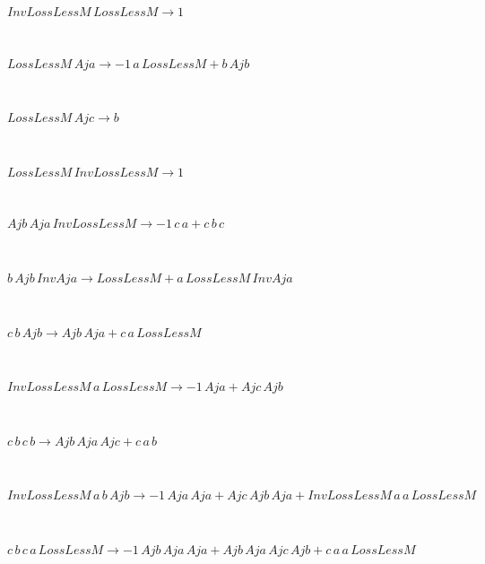 \documentclass[rep10,leqno]{report}
\begin{document}
\begin{minipage}{6in}
$
InvLossLessM\,
 LossLessM\rightarrow 1
$
\end{minipage}\medskip \\
\begin{minipage}{6in}
$
LossLessM\,
 Aja\rightarrow -1\,
 a\,
 LossLessM + b\,
 Ajb
$
\end{minipage}\medskip \\
\begin{minipage}{6in}
$
LossLessM\,
 Ajc\rightarrow b
$
\end{minipage}\medskip \\
\begin{minipage}{6in}
$
LossLessM\,
 InvLossLessM\rightarrow 1
$
\end{minipage}\medskip \\
\begin{minipage}{6in}
$
Ajb\,
 Aja\,
 InvLossLessM\rightarrow -1\,
 c\,
 a + c\,
 b\,
 c
$
\end{minipage}\medskip \\
\begin{minipage}{6in}
$
b\,
 Ajb\,
 InvAja\rightarrow LossLessM + a\,
 LossLessM\,
 InvAja
$
\end{minipage}\medskip \\
\begin{minipage}{6in}
$
c\,
 b\,
 Ajb\rightarrow Ajb\,
 Aja + c\,
 a\,
 LossLessM
$
\end{minipage}\medskip \\
\begin{minipage}{6in}
$
InvLossLessM\,
 a\,
 LossLessM\rightarrow -1\,
 Aja + Ajc\,
 Ajb
$
\end{minipage}\medskip \\
\begin{minipage}{6in}
$
c\,
 b\,
 c\,
 b\rightarrow Ajb\,
 Aja\,
 Ajc + c\,
 a\,
 b
$
\end{minipage}\medskip \\
\begin{minipage}{6in}
$
InvLossLessM\,
 a\,
 b\,
 Ajb\rightarrow -1\,
 Aja\,
 Aja + Ajc\,
 Ajb\,
 Aja + InvLossLessM\,
 a\,
 a\,
 LossLessM
$
\end{minipage}\medskip \\
\begin{minipage}{6in}
$
c\,
 b\,
 c\,
 a\,
 LossLessM\rightarrow -1\,
 Ajb\,
 Aja\,
 Aja + Ajb\,
 Aja\,
 Ajc\,
 Ajb + c\,
 a\,
 a\,
 LossLessM
$
\end{minipage}\medskip \\
\end{document}
